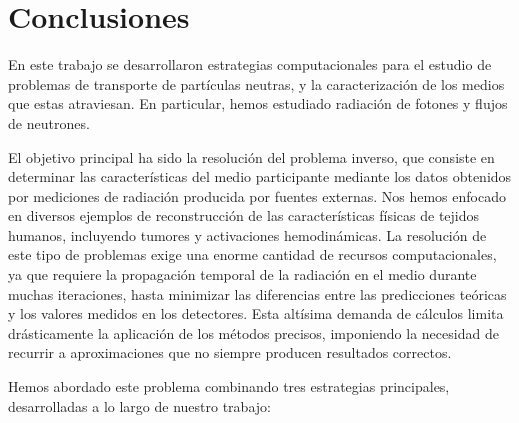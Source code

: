 \pagestyle{fancy}
\chapter{Conclusiones}
\label{cap:conc}
\lhead{\thepage}
\vspace{0.01\textheight}

\clearpage \pagebreak En este trabajo se desarrollaron estrategias computacionales para el 
estudio de problemas de transporte de partículas neutras, y la 
caracterización de los medios que estas atraviesan.
En particular, hemos estudiado radiación de fotones y 
flujos de neutrones.

El objetivo principal ha sido la resolución del 
problema inverso, que consiste en determinar las características 
del medio participante mediante los datos obtenidos por mediciones 
de radiación producida por fuentes externas.
Nos hemos enfocado en diversos ejemplos de 
reconstrucción de las características físicas de tejidos humanos, 
incluyendo tumores y activaciones hemodinámicas.
La resolución de este tipo de problemas exige una enorme cantidad 
de recursos computacionales, ya que requiere la propagación temporal 
de la radiación en el medio durante muchas iteraciones, 
hasta minimizar las diferencias entre las predicciones teóricas y 
los valores medidos en los detectores. 
Esta altísima demanda de cálculos limita drásticamente 
la aplicación de los métodos precisos, imponiendo la necesidad de 
recurrir a aproximaciones que no siempre producen resultados correctos.

Hemos abordado este problema combinando tres estrategias principales, 
desarrolladas a lo largo de nuestro trabajo:

